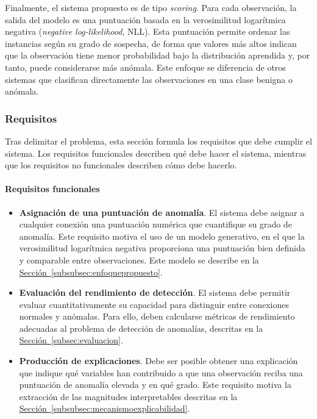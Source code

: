 \documentclass[12pt]{extarticle}
\numberwithin{equation}{section}
\begin{document}
\begin{refsection}
Finalmente, el sistema propuesto es de tipo \textit{scoring}. Para cada observación, la salida del modelo es una puntuación basada en la verosimilitud logarítmica negativa (\textit{negative log-likelihood}, NLL). Esta puntuación permite ordenar las instancias según su grado de sospecha, de forma que valores más altos indican que la observación tiene menor probabilidad bajo la distribución aprendida y, por tanto, puede considerarse más anómala. Este enfoque se diferencia de otros sistemas que clasifican directamente las observaciones en una clase benigna o anómala.

\subsubsection{Requisitos}
\label{subsubsec:requisitos}

Tras delimitar el problema, esta sección formula los requisitos que debe cumplir el sistema. Los requisitos funcionales describen qué debe hacer el sistema, mientras que los requisitos no funcionales describen cómo debe hacerlo.

\paragraph{Requisitos funcionales}
\label{par:requisitosfuncionales}
\mbox{}

\begin{itemize}
    \item \textbf{Asignación de una puntuación de anomalía}. El sistema debe asignar a cualquier conexión una puntuación numérica que cuantifique su grado de anomalía. Este requisito motiva el uso de un modelo generativo, en el que la verosimilitud logarítmica negativa proporciona una puntuación bien definida y comparable entre observaciones. Este modelo se describe en la \hyperref[subsubsec:enfoquepropuesto]{Sección~\ref*{subsubsec:enfoquepropuesto}}.

    \item \textbf{Evaluación del rendimiento de detección}.  El sistema debe permitir evaluar cuantitativamente su capacidad para distinguir entre conexiones normales y anómalas. Para ello, deben calcularse métricas de rendimiento adecuadas al problema de detección de anomalías, descritas en la \hyperref[subsec:evaluacion]{Sección~\ref*{subsec:evaluacion}}.
    
    \item \textbf{Producción de explicaciones}. Debe ser posible obtener una explicación que indique qué variables han contribuido a que una observación reciba una puntuación de anomalía elevada y en qué grado. Este requisito motiva la extracción de las magnitudes interpretables descritas en la \hyperref[subsubsec:mecanismoexplicabilidad]{Sección~\ref*{subsubsec:mecanismoexplicabilidad}}.
\end{itemize}


\end{refsection}
\end{document}
